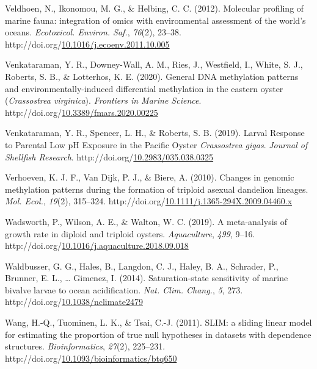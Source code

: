 \documentclass [11pt, proquest] {uwthesis}[2015/03/03]
\newlength{\cslhangindent}
\newenvironment{CSLReferences}%
{\setlength{\parindent}{0pt}%
\everypar{\setlength{\hangindent}{\cslhangindent}}\ignorespaces}%
{\par}
\begin{document}
\begin{CSLReferences}{1}{0}
\leavevmode\hypertarget{ref-Veldhoen2012}{}%
Veldhoen, N., Ikonomou, M. G., \& Helbing, C. C. (2012). {Molecular profiling of marine fauna: integration of omics with environmental assessment of the world's oceans}. \emph{Ecotoxicol. Environ. Saf.}, \emph{76}(2), 23--38. http://doi.org/\href{https://doi.org/10.1016/j.ecoenv.2011.10.005}{10.1016/j.ecoenv.2011.10.005}

\leavevmode\hypertarget{ref-Venkataraman2020}{}%
Venkataraman, Y. R., Downey-Wall, A. M., Ries, J., Westfield, I., White, S. J., Roberts, S. B., \& Lotterhos, K. E. (2020). {General DNA methylation patterns and environmentally-induced differential methylation in the eastern oyster (\emph{Crassostrea virginica})}. \emph{Frontiers in Marine Science}. http://doi.org/\href{https://doi.org/10.3389/fmars.2020.00225}{10.3389/fmars.2020.00225}

\leavevmode\hypertarget{ref-Venkataraman2019}{}%
Venkataraman, Y. R., Spencer, L. H., \& Roberts, S. B. (2019). {Larval Response to Parental Low pH Exposure in the Pacific Oyster \emph{Crassostrea gigas}}. \emph{Journal of Shellfish Research}. http://doi.org/\href{https://doi.org/10.2983/035.038.0325}{10.2983/035.038.0325}

\leavevmode\hypertarget{ref-Verhoeven2010}{}%
Verhoeven, K. J. F., Van Dijk, P. J., \& Biere, A. (2010). {Changes in genomic methylation patterns during the formation of triploid asexual dandelion lineages}. \emph{Mol. Ecol.}, \emph{19}(2), 315--324. http://doi.org/\href{https://doi.org/10.1111/j.1365-294X.2009.04460.x}{10.1111/j.1365-294X.2009.04460.x}

\leavevmode\hypertarget{ref-Wadsworth2019}{}%
Wadsworth, P., Wilson, A. E., \& Walton, W. C. (2019). {A meta-analysis of growth rate in diploid and triploid oysters}. \emph{Aquaculture}, \emph{499}, 9--16. http://doi.org/\href{https://doi.org/10.1016/j.aquaculture.2018.09.018}{10.1016/j.aquaculture.2018.09.018}

\leavevmode\hypertarget{ref-Waldbusser2014}{}%
Waldbusser, G. G., Hales, B., Langdon, C. J., Haley, B. A., Schrader, P., Brunner, E. L., \ldots{} Gimenez, I. (2014). {Saturation-state sensitivity of marine bivalve larvae to ocean acidification}. \emph{Nat. Clim. Chang.}, \emph{5}, 273. http://doi.org/\href{https://doi.org/10.1038/nclimate2479}{10.1038/nclimate2479}

\leavevmode\hypertarget{ref-Wang2011}{}%
Wang, H.-Q., Tuominen, L. K., \& Tsai, C.-J. (2011). {SLIM: a sliding linear model for estimating the proportion of true null hypotheses in datasets with dependence structures}. \emph{Bioinformatics}, \emph{27}(2), 225--231. http://doi.org/\href{https://doi.org/10.1093/bioinformatics/btq650}{10.1093/bioinformatics/btq650}


\end{CSLReferences}
\end{document}
